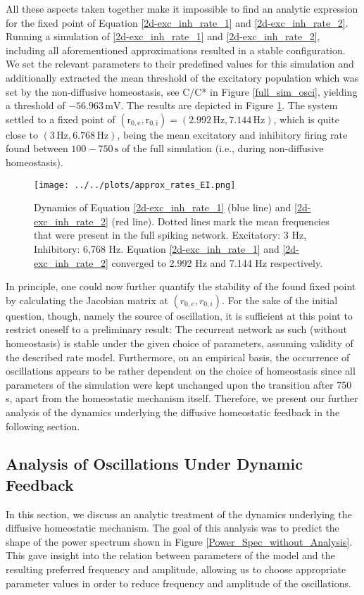 \documentclass[10pt,a4paper]{article}
\begin{document}
All these aspects taken together make it impossible to find an analytic expression for the fixed point of Equation \eqref{2d-exc_inh_rate_1} and \eqref{2d-exc_inh_rate_2}. Running a simulation of \eqref{2d-exc_inh_rate_1} and \eqref{2d-exc_inh_rate_2}, including all aforementioned approximations resulted in a stable configuration. We set the relevant parameters to their predefined values for this simulation and additionally extracted the mean threshold of the excitatory population which was set by the non-diffusive homeostasis, see C/C* in Figure \ref{full_sim_osci}, yielding a threshold of $\mathrm{-56.963\, mV}$. The results are depicted in Figure \ref{Dyn_Rate_Approx}. The system settled to a fixed point of $\mathrm{(r_{0,e},r_{0,i}) = (2.992\, Hz, 7.144\, Hz)}$, which is quite close to $\mathrm{(3\, Hz, 6.768\, Hz)}$, being the mean excitatory and inhibitory firing rate found between $\mathrm{100-750\, s}$ of the full simulation (i.e., during non-diffusive homeostasis).
\begin{figure}
\begin{center}
\texttt{[image: ../../plots/approx\_rates\_EI.png]}
\end{center}
\caption[Dynamics of rate-based network model]{Dynamics of Equation \eqref{2d-exc_inh_rate_1} (blue line) and \eqref{2d-exc_inh_rate_2} (red line). Dotted lines mark the mean frequencies that were present in the full spiking network. Excitatory: 3 Hz, Inhibitory: 6,768 Hz. Equation \eqref{2d-exc_inh_rate_1} and \eqref{2d-exc_inh_rate_2} converged to 2.992 Hz and 7.144 Hz respectively.}
\label{Dyn_Rate_Approx}
\end{figure}
In principle, one could now further quantify the stability of the found fixed point by calculating the Jacobian matrix at $(r_{0,e},r_{0,i})$. For the sake of the initial question, though, namely the source of oscillation, it is sufficient at this point to restrict oneself to a preliminary result: The recurrent network as such (without homeostasis) is stable under the given choice of parameters, assuming validity of the described rate model. Furthermore, on an empirical basis, the occurrence of oscillations appears to be rather dependent on the choice of homeostasis since all parameters of the simulation were kept unchanged upon the transition after 750 s, apart from the homeostatic mechanism itself. Therefore, we present our further analysis of the dynamics underlying the diffusive homeostatic feedback in the following section.

\subsection{Analysis of Oscillations Under Dynamic Feedback}\label{theor_osc}
In this section, we discuss an analytic treatment of the dynamics underlying the diffusive homeostatic mechanism. The goal of this analysis was to predict the shape of the power spectrum shown in Figure \ref{Power_Spec_without_Analysis}. This gave insight into the relation between parameters of the model and the resulting preferred frequency and amplitude, allowing us to choose appropriate parameter values in order to reduce frequency and amplitude of the oscillations.
\end{document}
